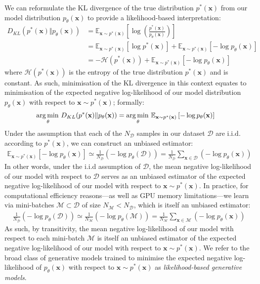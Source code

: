 \documentclass[ oneside,%
                    author={George Herbert},
                    degree={MSci},
                     title={Video Diffusion Models for Climate Simulations},
                  subtitle={}]{dissertation}
\begin{document}
We can reformulate the KL divergence of the true distribution $p^*(\mathbf{x})$ from our model distribution $p_\theta(\mathbf{x})$ to provide a likelihood-based interpretation:
\begin{align}
      D_{KL}(p^*(\mathbf{x})\Vert p_\theta(\mathbf{x}))&=\mathbb{E}_{\mathbf{x}\sim p^*(\mathbf{x})}\left[\log\left(\frac{p^*(\mathbf{x})}{p_\theta(\mathbf{x})}\right)\right]\\
      &=\mathbb{E}_{\mathbf{x}\sim p^*(\mathbf{x})}\left[\log p^*(\mathbf{x})\right]+\mathbb{E}_{\mathbf{x}\sim p^*(\mathbf{x})}\left[-\log p_\theta(\mathbf{x})\right]\\
      &=-\mathcal{H}(p^*(\mathbf{x}))+\mathbb{E}_{\mathbf{x}\sim p^*(\mathbf{x})}\left[-\log p_\theta(\mathbf{x})\right]
\end{align}
where $\mathcal{H}{(p^*(\mathbf{x}))}$ is the entropy of the true distribution $p^*(\mathbf{x})$ and is constant. As such, minimisation of the KL divergence in this context equates to minimisation of the expected negative log-likelihood of our model distribution $p_\theta(\mathbf{x})$ with respect to $\mathbf{x}\sim p^*(\mathbf{x})$; formally:
\begin{align}
      \operatorname*{arg\,min\,}_\theta D_{KL}(p^*(\mathbf{x})\Vert p_\theta(\mathbf{x}))&=\operatorname*{arg\,min\,}_\theta \mathbb{E}_{\mathbf{x}\sim p^*(\mathbf{x})}\left[-\log p_\theta(\mathbf{x})\right]
\end{align}
Under the assumption that each of the $N_\mathcal{D}$ samples in our dataset $\mathcal{D}$ are i.i.d. according to $p^*(\mathbf{x})$, we can construct an unbiased estimator:
\begin{align}
      \mathbb{E}_{\mathbf{x}\sim p^*(\mathbf{x})}\left[-\log p_\theta(\mathbf{x})\right]\simeq \frac{1}{N_{\mathcal{D}}}\left(-\log p_\theta(\mathcal{D})\right) = \frac{1}{N_{\mathcal{D}}} \sum_{\mathbf{x}\in\mathcal{D}} \left(-\log p_\theta(\mathbf{x})\right)
\end{align}
In other words, under the i.i.d assumption of $\mathcal{D}$, the mean negative log-likelihood of our model with respect to $\mathcal{D}$ serves as an unbiased estimator of the expected negative log-likelihood of our model with respect to $\mathbf{x}\sim p^*(\mathbf{x})$. In practice, for computational efficiency reasons---as well as GPU memory limitations---we learn via mini-batches $\mathcal{M}\subset \mathcal{D}$ of size $N_\mathcal{M} < N_\mathcal{D}$, which is itself an unbiased estimator:
\begin{align}
      \frac{1}{N_\mathcal{D}}\left(-\log p_\theta(\mathcal{D})\right)\simeq \frac{1}{N_\mathcal{M}}\left(-\log p_\theta(\mathcal{M})\right)=\frac{1}{N_\mathcal{M}}\sum_{\mathbf{x}\in\mathcal{M}}\left(-\log p_\theta(\mathbf{x})\right)
\end{align}
As such, by transitivity, the mean negative log-likelihood of our model with respect to each mini-batch $\mathcal{M}$ is itself an unbiased estimator of the expected negative log-likelihood of our model with respect to $\mathbf{x}\sim p^*(\mathbf{x})$. We refer to the broad class of generative models trained to minimise the expected negative log-likelihood of $p_\theta(\mathbf{x})$ with respect to $\mathbf{x}\sim p^*(\mathbf{x})$ as \textit{likelihood-based generative models}.
\end{document}
